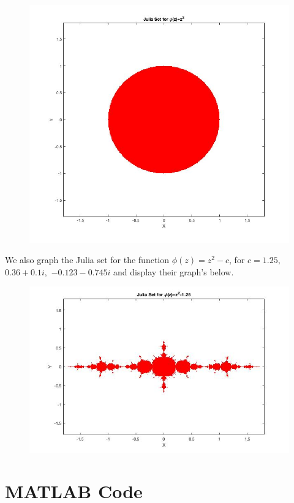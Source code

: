 \documentclass[12pt]{article}
\begin{document}
		\begin{figure}[h!]
			\centering
			\includegraphics[width=0.6\linewidth, height=.42\textheight]{fig_1}
			\caption{}
			\label{fig:fig1}
		\end{figure}
	
	
	We also graph the Julia set for the function $\phi(z)=z^2-c$, for $c=1.25,$ $0.36+0.1i,$ $-0.123-0.745i$ and display their graph's below. 
	
	\begin{figure}[h!]
		\centering
		\includegraphics[width=0.7\linewidth]{Julia_Set}
		\caption{}
		\label{fig:juliaset}
	\end{figure}
	
	
	


\section{MATLAB Code} \label{code}
	
	

	
\end{document}
